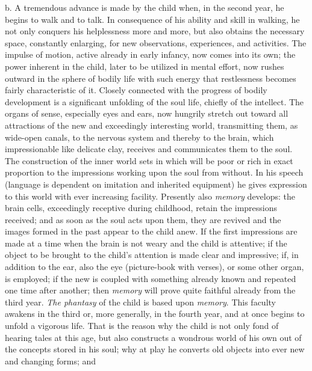 b. A tremendous advance is made by the child when, in the second year, he begins to walk and to talk. In consequence of his ability and skill in walking, he not only conquers his helplessness more and more, but also obtains the necessary space, constantly enlarging, for new observations, experiences, and activities. The impulse of motion, active already in early infancy, now comes into its own; the power
inherent in the child, later to be utilized in mental effort, now rushes outward in the sphere of bodily life with such energy that restlessness becomes fairly characteristic of it. Closely connected with the progress of bodily development is a significant unfolding of the soul life, chiefly of the intellect. The organs of sense, especially eyes and ears, now hungrily stretch out toward all attractions of the new and exceedingly interesting world, transmitting them, as wide-open canals, to the nervous system and thereby to the brain, which impressionable like delicate clay, receives and communicates them to the soul. The construction of the inner world sets in which will be poor or rich in exact proportion to the impressions working upon the soul from without. In his speech (language is dependent on imitation and inherited equipment) he gives expression to this world with ever increasing facility. Presently also \emph{memory} develops: the brain cells, exceedingly receptive during childhood, retain the impressions received; and as soon as the soul acts upon them, they are revived and the images formed in the past appear to the child anew. If the first impressions are made at a time when the brain is not weary and the child is attentive; if the object to be brought to the child's attention is made clear and impressive; if, in addition to the ear, also the eye (picture-book with verses), or some other organ, is employed; if the new is coupled with something already known and repeated one time after another; then \emph{memory} will prove quite faithful already from the third year. \emph{The phantasy} of the child is based upon \emph{memory}. This faculty awakens in the third or, more generally, in the fourth year, and at once begins to unfold a vigorous life. That is the reason why the child is not only fond of hearing tales at this age, but also constructs a wondrous world of his own out of the concepts stored in his soul; why at play he converts old objects into ever new and changing forms; and
